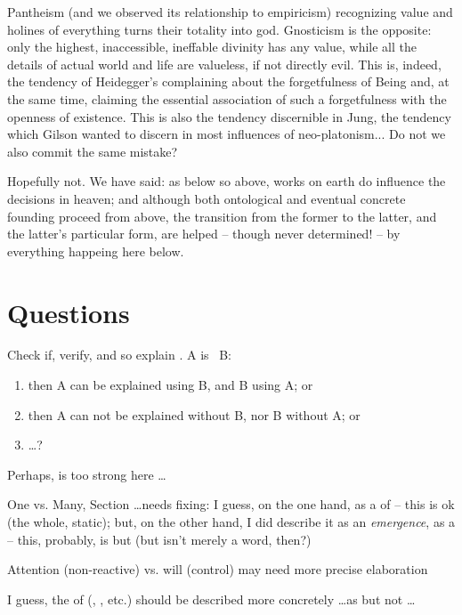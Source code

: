 Pantheism (and we observed its relationship to empiricism) recognizing value and
holines of everything turns their totality into god. Gnosticism is the opposite:
only the highest, inaccessible, ineffable divinity has any value, while all the
details of actual world and life are valueless, if not directly evil. This is,
indeed, the tendency of Heidegger's complaining about the forgetfulness of Being
and, at the same time, claiming the essential association of such a
forgetfulness with the openness of existence. This is also the tendency
discernible in Jung, the tendency which Gilson wanted to discern in most
influences of neo-platonism... Do not we also commit the same mistake?

Hopefully not. We have said: as below so above, works on earth do influence the
decisions in heaven; and although both ontological and eventual concrete
founding proceed from above, the transition from the former to the latter, and
the latter's particular form, are helped -- though never determined! -- by
everything happeing here below. 

\section*{Questions}
\pa
Check if, verify, and so explain \equin. A is \equi\ B:
\begin{enumerate}
\item
then A can be explained using B, and B using A; 
or
\item
then A can not be explained without B, nor B without A; or
\item \ldots ?
\end{enumerate}
Perhaps,  is too strong here \ldots

\pa One vs.  Many, Section  \ldots needs fixing: I
guess, on the one hand, as a  of  -- this is ok
(the whole, static); but, on the other hand, I did describe it as an
{\em emergence}, as a  -- this, probably, is but
 (but isn't  merely a word, then?)

\pa
Attention (non-reactive) vs. will (control) may need more precise elaboration

\pa
I guess, the  of  (, 
, etc.) should be described more concretely \ldots as 
 but not \ldots

